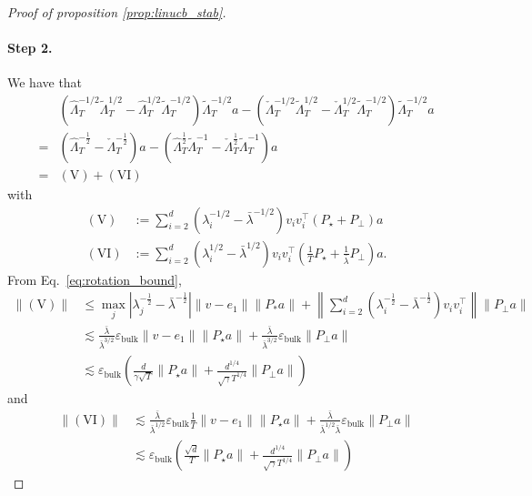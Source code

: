 \documentclass[11pt]{article}
\begin{document}
\begin{proof}[Proof of proposition \ref{prop:linucb_stab}]
\paragraph{Step 2.} We have that 
\begin{align*}
 &\left(\widehat \Lambda_T^{-1/2} \widetilde \Lambda_T^{1/2} - \widehat \Lambda_T^{1/2} \widetilde\Lambda_T^{-1/2}\right) \widetilde\Lambda_T^{-1/2} a - \left(\check \Lambda_T^{-1/2} \widetilde\Lambda_T^{1/2} - \check \Lambda_T^{1/2} \widetilde\Lambda_T^{-1/2}\right) \widetilde\Lambda_T^{-1/2} a \\
=& \left(\hat{\Lambda}_T^{-\frac{1}{2}} - \check{\Lambda}_T^{-\frac{1}{2}}\right)a  - \left(\hat{\Lambda}_T^{\frac{1}{2}}\widetilde\Lambda_T^{-1} - \check{\Lambda}_T^{\frac{1}{2}}\widetilde\Lambda_T^{-1}\right)a\\
= & (\mathrm{V}) + (\mathrm{VI}) 
\end{align*}
with
\begin{align*}
    (\mathrm{V}) &:=  \sum_{i=2}^d (\lambda_i^{-1/2} - \bar \lambda^{-1/2}) v_i v_i^\top (P_\star + P_\perp) a  \\
    (\mathrm{VI}) &:=  \sum_{i=2}^d (\lambda_i^{1/2} - \bar \lambda^{1/2}) v_i v_i^\top \left(  \frac{1}{T} P_\star + \frac{1}{\bar \lambda} P_\perp  \right) a. 
\end{align*}
From Eq.~\eqref{eq:rotation_bound},
\begin{align*}
\|(\mathrm{V})\| &\leq \max_{j}\left|\lambda_j^{-\frac{1}{2}} - \bar{\lambda}^{-\frac{1}{2}}\right|\|v-e_1\|\|P_{\ast}a\| + \left\|\sum_{i=2}^{d}\left(\lambda_i^{-\frac{1}{2}} - \bar{\lambda}^{-\frac{1}{2}}\right)v_iv_i^{\top}\right\| \|P_{\perp}a\|\\
&\lesssim \frac{\bar \lambda}{\bar \lambda^{3/2}} \varepsilon_{\mathrm{bulk}} \| v-e_1 \| \|P_\star a\| + \frac{\bar \lambda}{\bar \lambda^{3/2}} \varepsilon_{\mathrm{bulk}} \| P_\perp a\| \\
&\lesssim \varepsilon_{\mathrm{bulk}} \left( \frac{d}{\gamma \sqrt{T}} \| P_\star a \| + \frac{d^{1/4}}{\sqrt{\gamma} T^{1/4}}  \| P_\perp a\| \right) 
\end{align*}
and
\begin{align*}
\|(\mathrm{VI})\| & \lesssim \frac{\bar \lambda}{\bar \lambda^{1/2}} \varepsilon_{\mathrm{bulk}} \frac{1}{T} \| v - e_1 \| \|P_\star a\| + \frac{\bar \lambda}{\bar \lambda^{1/2} \bar \lambda} \varepsilon_{\mathrm{bulk}} \|P_\perp a\| \\
& \lesssim \varepsilon_{\mathrm{bulk}} \left( \frac{\sqrt{d}}{T} \| P_\star a \| + \frac{d^{1/4}}{\sqrt{\gamma} T^{1/4}}  \| P_\perp a\| \right) 
\end{align*}


\end{proof}
\end{document}
